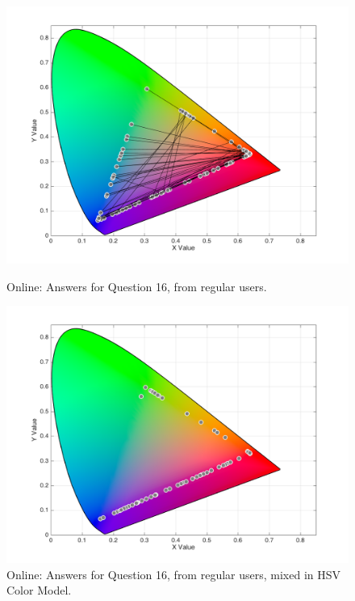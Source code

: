 \begin{figure}[htbp]
  \centering
  \vspace{-15pt}
  \begin{minipage}{0.4\textwidth}
    \centering
    \includegraphics[width=\textwidth]{images/results/16_online_regularUsers.png}
    \caption[Online: Answers for Question 16, from regular users.]{Online: Answers for Question 16, from regular users.}
    \label{fig:onlineregular_16}
  \end{minipage}
  \begin{minipage}{0.4\textwidth}
    \centering
    \includegraphics[width=\textwidth]{images/results/16_online_HSVresponses.png}
    \caption[Online: Answers for Question 16, from regular users, mixed in HSV Color Model.]{Online: Answers for Question 16, from regular users, mixed in HSV Color Model.}
    \label{fig:onlinehsvregular_16}
  \end{minipage}
  \vspace{-5pt}
\end{figure}
%
